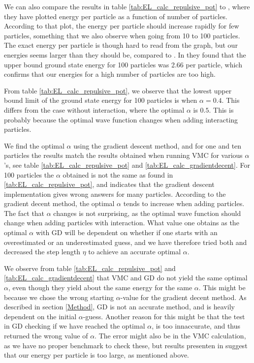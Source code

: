 \documentclass[norsk,a4paper,12pt]{article}
\begin{document}
We can also compare the results in table \ref{tab:EL_calc_repulsive_pot} to \cite{DuBois}, where they have plotted energy per particle as a function of number of particles. According to that plot, the energy per particle should increase rapidly for few particles, something that we also observe when going from 10 to 100 particles. The exact energy per particle is though hard to read from the graph, but our energies seems larger than they should be, compared to \cite{DuBois}. In \cite{Dalfovo} they found that the upper bound ground state energy for 100 particles was 2.66 per particle, which confirms that our energies for a high number of particles are too high.

From table \ref{tab:EL_calc_repulsive_pot}, we observe that the lowest upper bound limit of the ground state energy for 100 particles is when $\alpha=0.4$.  This differs from the case without interaction, where the optimal $\alpha$ is $0.5$. This is probably because the optimal wave function changes when adding interacting particles.
\par
\vspace{3mm}

We find the optimal $\alpha$ using the gradient descent method, and for one and ten particles the results match the results obtained when running VMC for various $\alpha$'s, see table \ref{tab:EL_calc_repulsive_pot} and \ref{tab:EL_calc_gradientdecent}. For 100 particles the $\alpha$ obtained is not the same as found in \ref{tab:EL_calc_repulsive_pot}, and indicates that the gradient descent implementation gives wrong answers for many particles. According to the gradient decent method, the optimal $\alpha$ tends to increase when adding particles. The fact that $\alpha$ changes is not surprising, as the optimal wave function should change when adding particles with interaction. What value one obtains as the optimal $\alpha$ with GD will be dependent on whether if one starts with an overestimated or an underestimated guess, and we have therefore tried both and decreased the step length $\eta$ to achieve an accurate optimal $\alpha$.
\par 
\vspace{3mm}

We observe from table \ref{tab:EL_calc_repulsive_pot} and \ref{tab:EL_calc_gradientdecent} that VMC and GD do not yield the same optimal $\alpha$, even though they yield about the same energy for the same $\alpha$. This might be because we chose the wrong starting $\alpha$-value for the gradient decent method. As described in section \ref{Method}, GD is not an accurate method, and is heavily dependent on the initial $\alpha$-guess. Another reason for this might be that the test in GD checking if we have reached the optimal $\alpha$, is too innaccurate, and thus returned the wrong value of $\alpha$. The error might also be in the VMC calculation, as we have no proper benchmark to check these, but results presenten in \cite{DuBois} suggest that our energy per particle is too large, as mentioned above.
\par 
\vspace{3mm}
\end{document}
